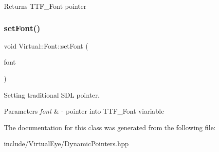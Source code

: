 \begin{DoxyReturn}{Returns}
T\+T\+F\+\_\+\+Font pointer 
\end{DoxyReturn}
\hypertarget{class_virtual_1_1_font_ad0ca95bbe50987aedb3b6efa53ec252b}{}\label{class_virtual_1_1_font_ad0ca95bbe50987aedb3b6efa53ec252b} 
\subsubsection{\texorpdfstring{set\+Font()}{setFont()}}
{\footnotesize\ttfamily void Virtual\+::\+Font\+::set\+Font (\begin{DoxyParamCaption}\item[{T\+T\+F\+\_\+\+Font $\ast$}]{font }\end{DoxyParamCaption})}



Setting traditional S\+DL pointer. 


\begin{DoxyParams}{Parameters}
{\em font} & -\/ pointer into T\+T\+F\+\_\+\+Font viariable \\
\hline
\end{DoxyParams}


The documentation for this class was generated from the following file\+:\begin{DoxyCompactItemize}
\item 
include/\+Virtual\+Eye/Dynamic\+Pointers.\+hpp\end{DoxyCompactItemize}
